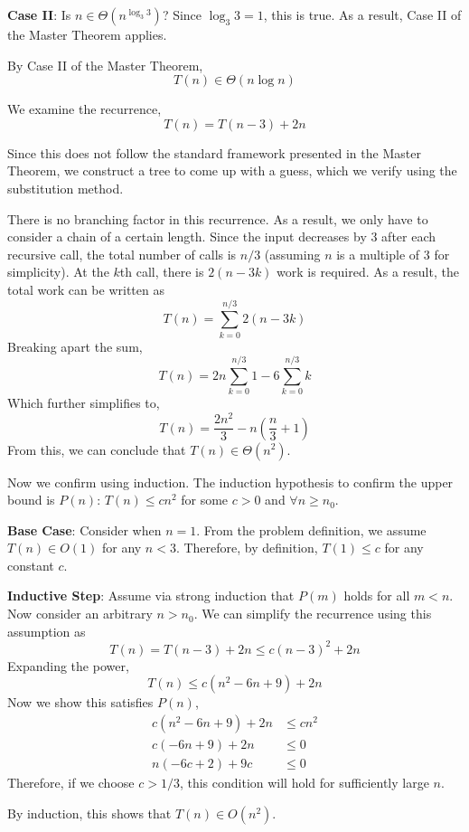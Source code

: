 \documentclass[12pt,twoside]{article}
\begin{document}
\begin{problems}
\begin{problemparts}
\textbf{Case II}: Is $n \in \Theta\left(n^{\log_3 3}\right)$? Since $\log_3 3 =
1$, this is true. As a result, Case II of the Master Theorem applies.

By Case II of the Master Theorem,
$$ T(n) \in \Theta\left(n \log n\right) $$

\problempart %

We examine the recurrence,
$$ T(n) = T(n - 3) + 2n $$

Since this does not follow the standard framework presented in the Master
Theorem, we construct a tree to come up with a guess, which we verify using the
substitution method.

There is no branching factor in this recurrence. As a result, we only have to
consider a chain of a certain length. Since the input decreases by $3$ after
each recursive call, the total number of calls is $n / 3$ (assuming $n$ is a
multiple of $3$ for simplicity). At the $k$th call, there is $2(n - 3k)$ work is
required. As a result, the total work can be written as
$$ T(n) = \sum_{k = 0}^{n / 3} 2(n - 3k) $$
Breaking apart the sum,
$$ T(n) = 2n \sum_{k = 0}^{n / 3} 1 - 6 \sum_{k = 0}^{n / 3} k $$
Which further simplifies to,
$$ T(n) = \frac{2n^2}{3} - n \left(\frac{n}{3} + 1\right) $$
From this, we can conclude that $T(n) \in \Theta\left(n^2\right)$.

Now we confirm using induction. The induction hypothesis to confirm the upper
bound is $P(n)$: $T(n) \leq c n^2$ for some $c > 0$ and $\forall n \geq n_0$.

\textbf{Base Case}: Consider when $n = 1$. From the problem definition, we assume
$T(n) \in O(1)$ for any $n < 3$. Therefore, by definition, $T(1) \leq c$ for any
constant $c$.

\textbf{Inductive Step}: Assume via strong induction that $P(m)$ holds for all
$m < n$. Now consider an arbitrary $n > n_0$. We can simplify the recurrence
using this assumption as
$$ T(n) = T(n - 3) + 2n \leq c (n - 3)^2 + 2n $$
Expanding the power,
$$ T(n) \leq c (n^2 - 6n + 9) + 2n $$
Now we show this satisfies $P(n)$,
\begin{align*}
    c (n^2 - 6n + 9) + 2n &\leq c n^2 \\
    c(-6n + 9) + 2n &\leq 0 \\
    n(-6c + 2) + 9c &\leq 0
\end{align*}
Therefore, if we choose $c > 1/3$, this condition will hold for sufficiently
large $n$.

By induction, this shows that $T(n) \in O(n^2)$. 


\end{problemparts}
\end{problems}
\end{document}
